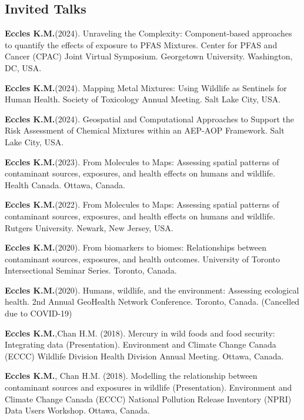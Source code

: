 \documentclass[margin,line]{res}
\begin{document}
\begin{resume}
\section{\sc Invited Talks}

\begin{etaremune}[start=9]

\item \textbf{Eccles K.M.}(2024). Unraveling the Complexity: Component-based approaches to quantify the effects of exposure to PFAS Mixtures. Center for PFAS and Cancer (CPAC) Joint Virtual Symposium. Georgetown University. Washington, DC, USA.

\item \textbf{Eccles K.M.}(2024). Mapping Metal Mixtures: Using Wildlife as Sentinels for Human Health. Society of Toxicology Annual Meeting. Salt Lake City, USA.

\item \textbf{Eccles K.M.}(2024). Geospatial and Computational Approaches to Support the Risk Assessment of Chemical Mixtures within an AEP-AOP Framework. Salt Lake City, USA.

\item \textbf{Eccles K.M.}(2023). From Molecules to Maps: Assessing spatial patterns of contaminant sources, exposures, and health effects on humans and wildlife. Health Canada. Ottawa, Canada.

\item \textbf{Eccles K.M.}(2022). From Molecules to Maps: Assessing spatial patterns of contaminant sources, exposures, and health effects on humans and wildlife. Rutgers University. Newark, New Jersey, USA.

\item \textbf{Eccles K.M.}(2020). From biomarkers to biomes: Relationships between contaminant sources, exposures, and health outcomes. University of Toronto Intersectional Seminar Series. Toronto, Canada.

\item \textbf{Eccles K.M.}(2020). Humans, wildlife, and the environment: Assessing ecological health. 2nd Annual GeoHealth Network Conference. Toronto, Canada. (Cancelled due to COVID-19)

\item \textbf{Eccles K.M.},Chan H.M. (2018). Mercury in wild foods and food security: Integrating data (Presentation). Environment and Climate Change Canada (ECCC) Wildlife Division Health Division Annual Meeting. Ottawa, Canada.

\item \textbf{Eccles K.M.}, Chan H.M. (2018). Modelling the relationship between contaminant sources and exposures in wildlife (Presentation). Environment and Climate Change Canada (ECCC) National Pollution Release Inventory (NPRI) Data Users Workshop. Ottawa, Canada.
\end{etaremune}


\end{resume}
\end{document}
